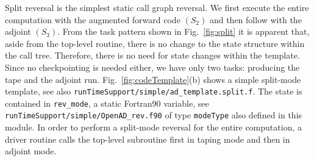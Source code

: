 \documentclass{book}
\newcommand{\code}[1]{{\small\tt{#1}}}
\newcommand{\reffig}[1]{{Fig.~\ref{#1}}}
\begin{document}
Split reversal is the simplest static call graph reversal. We first execute the entire computation 
with the augmented forward code $(S_2)$ and then 
follow with the adjoint $(S_3)$. 
From the task pattern 
shown in \reffig{fig:split} it is 
apparent that, aside from the top-level routine, there is 
no change to the state structure within the call tree.
Therefore, there is no need for state changes within the template. 
Since no checkpointing is needed either, we have only two tasks: 
producing the tape and the adjoint run.
\reffig{fig:codeTemplate}(b) shows a simple split-mode template, see also \code{runTimeSupport/simple/ad\_template.split.f}.
The state is contained in \code{rev\_mode}, a static Fortran90 variable, see \code{runTimeSupport/simple/OpenAD\_rev.f90}
of type \code{modeType} also defined in this module.  
In order to perform a split-mode reversal for the entire computation, a driver routine 
calls the top-level subroutine first in taping mode and then in adjoint mode.
\end{document}

